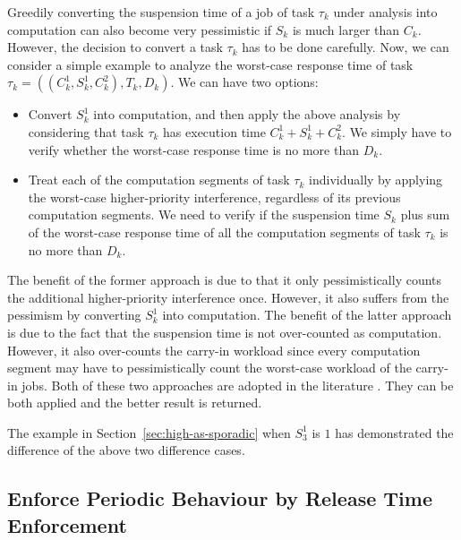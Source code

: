\begin{table}[t]
\begin{table}[t]
 Greedily converting the suspension time of a job of task $\tau_k$ under analysis into computation can also become very pessimistic if $S_k$ is much larger than $C_k$. However, the decision to convert a task $\tau_k$ has to be done carefully. Now, we can consider a simple example to analyze the worst-case response time of task $\tau_k = ((C_k^1, S_k^1, C_k^2), T_k, D_k)$. We can have two options:
\begin{itemize}
\item Convert $S_k^1$ into computation, and then apply the above analysis by considering that task $\tau_k$ has execution time $C_k^1+S_k^1+C_k^2$. We simply have to verify whether the worst-case response time is no more than $D_k$.
\item Treat each of the computation segments of task $\tau_k$ individually by applying the worst-case higher-priority interference, regardless of its previous computation segments. We need to verify if the suspension time $S_k$ plus sum of the worst-case response time of all the computation segments of task $\tau_k$ is no more than $D_k$. 
\end{itemize}
The benefit of the former approach is due to that it only pessimistically counts the additional higher-priority interference once. However, it also suffers from the pessimism by converting $S_k^1$ into computation. The benefit of the latter approach is due to the fact that the suspension time is not over-counted as computation. However, it also over-counts the carry-in workload since every computation segment may have to pessimistically count the worst-case workload of the carry-in jobs. Both of these two approaches are adopted in the literature \cite{ecrts15nelissen,Huang:multiseg,RTCSA-BletsasA05}. They can be both applied and the better result is returned.

The example in Section~\ref{sec:high-as-sporadic} when $S_3^1$ is $1$ has demonstrated the difference of the above two difference cases. 

\subsection{Enforce Periodic Behaviour by Release Time Enforcement}   
\label{sec:periodic-enforce}


\end{table}
\end{table}
